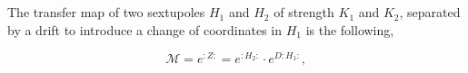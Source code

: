 
%
%
%
%
%
%
%
%



\subsection{}
\label{appendix:transfer_map:two_sextupoles}

The transfer map of two sextupoles $H_1$ and $H_2$ of strength $K_1$ and $K_2$, separated by a drift
to introduce a change of coordinates in $H_1$ is the following,

\begin{equation}
    \mathcal{M} = e^{:Z:} = e^{:H_{2}:} \cdot e^{D:H_{1}:},
\end{equation}

